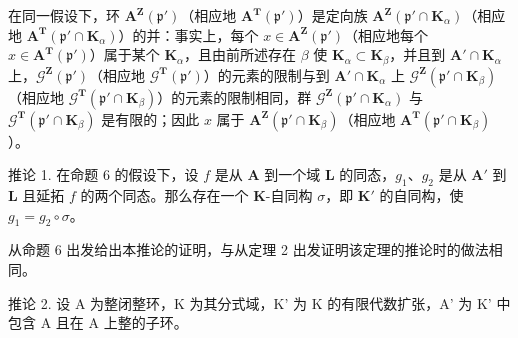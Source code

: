 在同一假设下，环 \(\mathbf{A}^{\mathbf{Z}}(\mathfrak{p}')\)（相应地 \(\mathbf{A}^{\mathbf{T}}(\mathfrak{p}')\)）是定向族 \(\mathbf{A}^{\mathbf{Z}}(\mathfrak{p}' \cap \mathbf{K}_{\alpha})\)（相应地 \(\mathbf{A}^{\mathbf{T}}(\mathfrak{p}' \cap \mathbf{K}_{\alpha})\)）的并：事实上，每个 \(x \in \mathbf{A}^{\mathbf{Z}}(\mathfrak{p}')\)（相应地每个 \(x \in \mathbf{A}^{\mathbf{T}}(\mathfrak{p}')\)）属于某个 \(\mathbf{K}_{\alpha}\)，且由前所述存在 \(\beta\) 使 \(\mathbf{K}_{\alpha} \subset \mathbf{K}_{\beta}\)，并且到 \(\mathbf{A}' \cap \mathbf{K}_{\alpha}\) 上，\(\mathcal{G}^{\mathbf{Z}}(\mathfrak{p}')\)（相应地 \(\mathcal{G}^{\mathbf{T}}(\mathfrak{p}')\)）的元素的限制与到 \(\mathbf{A}' \cap \mathbf{K}_{\alpha}\) 上 \(\mathcal{G}^{\mathbf{Z}}(\mathfrak{p}' \cap \mathbf{K}_{\beta})\)（相应地 \(\mathcal{G}^{\mathbf{T}}(\mathfrak{p}' \cap \mathbf{K}_{\beta})\)）的元素的限制相同，群 \(\mathcal{G}^{\mathbf{Z}}(\mathfrak{p}' \cap \mathbf{K}_{\alpha})\) 与 \(\mathcal{G}^{\mathbf{T}}(\mathfrak{p}' \cap \mathbf{K}_{\beta})\) 是有限的；因此 \(x\) 属于 \(\mathbf{A}^{\mathbf{Z}}(\mathfrak{p}' \cap \mathbf{K}_{\beta})\)（相应地 \(\mathbf{A}^{\mathbf{T}}(\mathfrak{p}' \cap \mathbf{K}_{\beta})\)）。

推论 1. 在命题 6 的假设下，设 \(f\) 是从 \(\mathbf{A}\) 到一个域 \(\mathbf{L}\) 的同态，\(g_1\)、\(g_2\) 是从 \(\mathbf{A}'\) 到 \(\mathbf{L}\) 且延拓 \(f\) 的两个同态。那么存在一个 \(\mathbf{K}\)-自同构 \(\sigma\)，即 \(\mathbf{K}'\) 的自同构，使 \(g_1 = g_2 \circ \sigma\)。

从命题 6 出发给出本推论的证明，与从定理 2 出发证明该定理的推论时的做法相同。

推论 2. 设 A 为整闭整环，K 为其分式域，K' 为 K 的有限代数扩张，A' 为 K' 中包含 A 且在 A 上整的子环。


